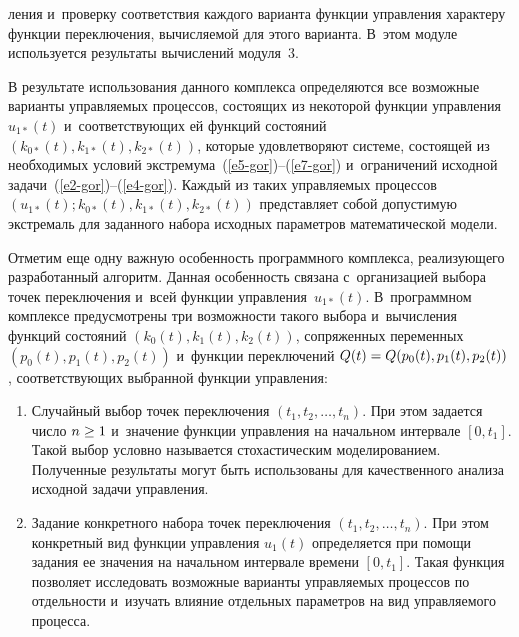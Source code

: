 \begin{multicols}{2}
\begin{enumerate}[1.]
\pagebreak

\noindent
ле\-ния и~проверку соответствия каждого варианта функции управления 
характеру функции переключения, вычисляемой для этого варианта.
В~этом модуле используется результаты вычислений модуля~3.
\end{enumerate}

В результате использования данного комплекса определяются все возможные 
варианты управля\-емых процессов, состоящих из некоторой функции управления $u_{1*}(t)$ 
и~соответствующих ей функций состояний $(k_{0*}(t),k_{1*}(t),k_{2*}(t))$, которые 
удовлетворяют системе, состоящей из необходимых условий экстремума~(\ref{e5-gor})--(\ref{e7-gor}) 
и~ограничений исходной задачи~(\ref{e2-gor})--(\ref{e4-gor}). 
Каждый из таких управляемых процессов $\left(u_{1*}(t);k_{0*}(t),k_{1*}(t),k_{2*}(t)\right)$ 
представляет собой допустимую экстремаль для заданного набора исходных параметров 
математической модели.

Отметим еще одну важную особенность программного комплекса, реализующего 
разработанный алгоритм. Данная особенность связана с~организацией выбора 
точек переключения и~всей функции управления~$u_{1*}(t)$. В~программном комплексе 
предусмотрены три возможности такого выбора и~вычисления функций 
состояний $(k_{0}(t),k_{1}(t),k_{2}(t))$, сопряженных 
переменных $(p_{0}(t),p_{1}(t),p_{2}(t))$ и~функции переключений 
$Q(t)\hm=Q(p_0(t),p_1(t),p_2(t))$, соответствующих выбранной функции управления:
\begin{enumerate}[1.]
\item Случайный выбор точек переключения $(t_1,t_2,\ldots,t_n)$. При этом задается 
чис\-ло $n \hm\geq 1$ и~значение функции управления на начальном интервале $[0,t_1]$. 
Такой выбор условно называется стохастическим моделированием. Полученные результаты 
могут быть использованы для качественного анализа исходной задачи управления.

\item Задание конкретного набора точек переключения $(t_1,t_2,\ldots,t_n)$. 
При этом конкретный вид функции управления $u_1(t)$ определяется при помощи задания 
ее значения на начальном интервале времени $[0,t_1]$. Такая функция позволяет 
исследовать возможные варианты управ\-ля\-емых процессов по отдельности и~изучать 
\mbox{влияние} отдельных параметров на вид управляемого процесса.


\end{enumerate}
\end{multicols}
